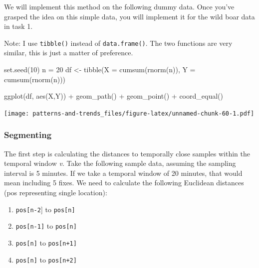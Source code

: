 \documentclass[
]{book}
\newenvironment{Shaded}{\begin{snugshade}}{\end{snugshade}}
\newcommand{\AttributeTok}[1]{\textcolor[rgb]{0.77,0.63,0.00}{#1}}
\newcommand{\DecValTok}[1]{\textcolor[rgb]{0.00,0.00,0.81}{#1}}
\newcommand{\FunctionTok}[1]{\textcolor[rgb]{0.00,0.00,0.00}{#1}}
\newcommand{\NormalTok}[1]{#1}
\newcommand{\OtherTok}[1]{\textcolor[rgb]{0.56,0.35,0.01}{#1}}
\newcommand{\SpecialCharTok}[1]{\textcolor[rgb]{0.00,0.00,0.00}{#1}}
\providecommand{\tightlist}{%
  \setlength{\itemsep}{0pt}\setlength{\parskip}{0pt}}
\begin{document}
We will implement this method on the following dummy data. Once you've grasped the idea on this simple data, you will implement it for the wild boar data in task 1.

Note: I use \texttt{tibble()} instead of \texttt{data.frame()}. The two functions are very similar, this is just a matter of preference.

\begin{Shaded}
\begin{Highlighting}[]

\FunctionTok{set.seed}\NormalTok{(}\DecValTok{10}\NormalTok{)}
\NormalTok{n }\OtherTok{=} \DecValTok{20}
\NormalTok{df }\OtherTok{\textless{}{-}} \FunctionTok{tibble}\NormalTok{(}\AttributeTok{X =} \FunctionTok{cumsum}\NormalTok{(}\FunctionTok{rnorm}\NormalTok{(n)), }\AttributeTok{Y =} \FunctionTok{cumsum}\NormalTok{(}\FunctionTok{rnorm}\NormalTok{(n)))}

\FunctionTok{ggplot}\NormalTok{(df, }\FunctionTok{aes}\NormalTok{(X,Y)) }\SpecialCharTok{+}
  \FunctionTok{geom\_path}\NormalTok{() }\SpecialCharTok{+} 
  \FunctionTok{geom\_point}\NormalTok{() }\SpecialCharTok{+}
  \FunctionTok{coord\_equal}\NormalTok{()}
\end{Highlighting}
\end{Shaded}

\texttt{[image: patterns-and-trends\_files/figure-latex/unnamed-chunk-60-1.pdf]}

\hypertarget{segmenting}{%
\subsubsection{Segmenting}\label{segmenting}}

The first step is calculating the distances to temporally close samples within the temporal window \emph{v}. Take the following sample data, assuming the sampling interval is 5 minutes. If we take a temporal window of 20 minutes, that would mean including 5 fixes. We need to calculate the following Euclidean distances (pos representing single location):

\begin{enumerate}
\def\labelenumi{\arabic{enumi}.}
\tightlist
\item
  \texttt{pos{[}n-2}{]} to \texttt{pos{[}n{]}}
\item
  \texttt{pos{[}n-1{]}} to \texttt{pos{[}n{]}}
\item
  \texttt{pos{[}n{]}} to \texttt{pos{[}n+1{]}}
\item
  \texttt{pos{[}n{]}} to \texttt{pos{[}n+2{]}}
\end{enumerate}
\end{document}
